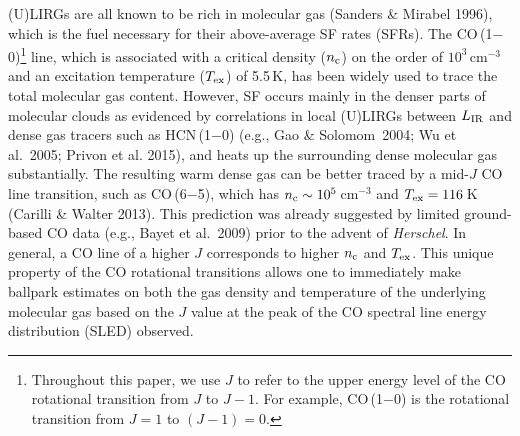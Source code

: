 \documentclass[preprint]{aastex}
\begin{document}
(U)LIRGs are all known to be rich in molecular gas (Sanders \& Mirabel 1996),
which is the fuel necessary for their above-average  SF rates (SFRs). 
The CO\,(1$-$0)\footnote{Throughout this paper, we use $J$ to refer to 
the upper energy level of the CO rotational transition from $J$ to $J-1$.
For example, CO\,(1$-$0) is the rotational transition from $J=1$ to $(J-1)=0$.}
line, which is associated with a critical density 
($n_{\rm c}$) on the order of $10^3\,$cm$^{-3}$ and an excitation temperature 
($T_{\rm ex}$) of 5.5\,K,  has been widely used to trace the total molecular
gas content.  However, SF occurs mainly in the denser parts of molecular clouds as 
evidenced by correlations in local (U)LIRGs between $L_{\rm IR}$ and dense gas 
tracers such as HCN\,(1$-$0) (e.g., Gao \& Solomom~2004; Wu et al.~2005; 
Privon et al. 2015), and heats up the surrounding 
dense molecular gas substantially.  The resulting warm dense gas can be better 
traced by a mid-$J$ CO line transition, such as CO\,(6$-$5),  
which has $n_{\rm c} \sim 10^5\,$cm$^{-3}$ and 
$T_{\rm ex} = 116$\,K (Carilli \& Walter 2013).  This prediction was already
suggested by limited ground-based CO data  (e.g., Bayet et al.~2009) prior to 
the advent of {\it Herschel}.  In general, a CO line of a higher $J$ corresponds to 
higher $n_{\rm c}$ and $T_{\rm ex}$.  This unique property of the CO rotational 
transitions allows one to immediately make ballpark estimates on 
both the gas density and temperature of the underlying molecular gas based on 
the $J$ value at the peak of the CO spectral line energy distribution (SLED) 
observed.
\end{document}
